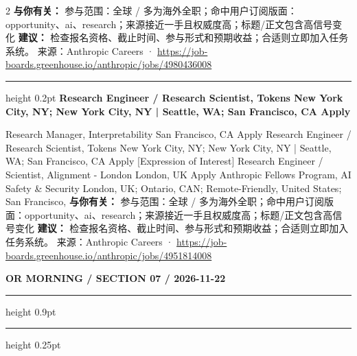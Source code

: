 \documentclass[10.5pt]{ctexart}
\begin{document}
\begin{multicols}{2}
\textbf{与你有关：} 参与范围：全球 / 多为海外全职；命中用户订阅版面：opportunity、ai、research；来源接近一手且权威度高；标题/正文包含高信号变化
\textbf{建议：} 检查报名资格、截止时间、参与形式和预期收益；合适则立即加入任务系统。
{\footnotesize\color{ormuted} 来源：Anthropic Careers · \url{https://job-boards.greenhouse.io/anthropic/jobs/4980436008}}
\vspace{2mm}
\hrule height 0.2pt
\vspace{2mm}
{\large\bfseries Research Engineer / Research Scientist, Tokens New York City, NY; New York City, NY | Seattle, WA; San Francisco, CA Apply}\par
[Expression of Interest] Research Manager, Interpretability San Francisco, CA Apply Research Engineer / Research Scientist, Tokens New York City, NY; New York City, NY | Seattle, WA; San Francisco, CA Apply [Expression of Interest] Research Engineer / Scientist, Alignment - London London, UK Apply Anthropic Fellows Program, AI Safety \& Security London, UK; Ontario, CAN; Remote-Friendly, United States; San Francisco, 
\textbf{与你有关：} 参与范围：全球 / 多为海外全职；命中用户订阅版面：opportunity、ai、research；来源接近一手且权威度高；标题/正文包含高信号变化
\textbf{建议：} 检查报名资格、截止时间、参与形式和预期收益；合适则立即加入任务系统。
{\footnotesize\color{ormuted} 来源：Anthropic Careers · \url{https://job-boards.greenhouse.io/anthropic/jobs/4951814008}}
\end{multicols}
\newpage
{\small\bfseries OR MORNING / SECTION 07 / 2026-11-22}
\vspace{2mm}
\hrule height 0.9pt
\vspace{1.5mm}
\hrule height 0.25pt
\vspace{4mm}
\end{document}
